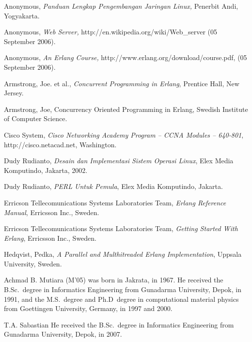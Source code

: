 \documentclass[final,
notitlepage,
narroweqnarray,
    inline,
    twoside,
]{ieee}
\begin{document}
\begin{thebibliography}{1}


Anonymous, \textit{Panduan Lengkap Pengembangan
Jaringan Linux, }Penerbit Andi, Yogyakarta.

Anonymous, \textit{Web Server,
}http://en.wikipedia.org/wiki/Web\_server (05 September 2006).

  Anonymous, \textit{An Erlang Course,
}http://www.erlang.org/download/course.pdf, (05 September 2006).

  Armstrong, Joe. et al., \textit{Concurrent Programming in
Erlang}, Prentice Hall, New Jersey.

  Armstrong, Joe,  Concurrency Oriented Programming in
Erlang, Swedish Institute of Computer Science.

  Cisco System, \textit{Cisco Networking Academy Program --
CCNA Modules -- 640-801}, http://cisco.netacad.net, Washington.

  Dudy Rudianto, \textit{Desain dan Implementasi Sistem
Operasi Linux}, Elex Media Komputindo, Jakarta, 2002.

  Dudy Rudianto, \textit{PERL Untuk Pemula}, Elex Media
Komputindo, Jakarta.

  Erricson Tellecomunications Systems Laboratories  Team,
\textit{Erlang Reference Manual}, Erricsson Inc., Sweden.

  Erricson Tellecomunications Systems Laboratories  Team,
\textit{Getting Started With Erlang}, Erricsson Inc., Sweden.

  Hedqvist, Pedka, \textit{A Parallel and Multhitreaded
Erlang Implementation}, Uppsala University, Sweden.

\end{thebibliography}

\begin{biography}{Achmad B. Mutiara}
(M'05) was born in Jakrata, in 1967. He received the B.Sc.\ degree
in Informatics Engineering from Gunadarma University, Depok, in
1991, and the M.S.\ degree and Ph.D\ degree in computational
material physics from Goettingen University, Germany, in 1997 and
2000.
\end{biography}


\begin{biography}{T.A. Sabastian}
He received the B.Sc.\ degree in Informatics Engineering from
Gunadarma University, Depok, in 2007.
\end{biography}
\end{document}
